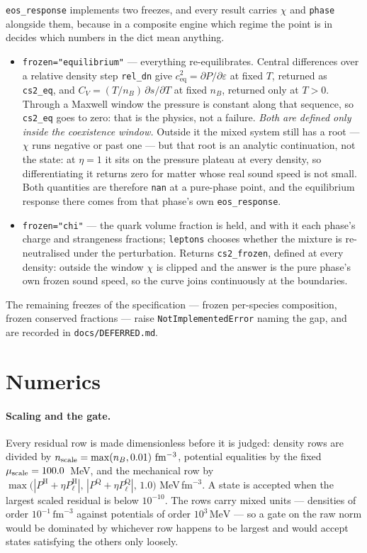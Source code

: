 \documentclass[aps,prc,onecolumn,superscriptaddress,nofootinbib,10pt]{revtex4-2}
\newcommand{\nB}{n_B}
\newcommand{\phH}{\mathrm{H}}
\newcommand{\phQ}{\mathrm{Q}}
\begin{document}
\texttt{eos\_response} implements two freezes, and every result carries
$\chi$ and \texttt{phase} alongside them, because in a composite engine which
regime the point is in decides which numbers in the dict mean anything.

\begin{itemize}
\item \texttt{frozen="equilibrium"} --- everything re-equilibrates. Central
  differences over a relative density step \texttt{rel\_dn} give
  $c_{\mathrm{eq}}^2 = \partial P/\partial\varepsilon$ at fixed $T$, returned
  as \texttt{cs2\_eq}, and $C_V = (T/\nB)\,\partial s/\partial T$ at fixed
  $\nB$, returned only at $T > 0$. Through a Maxwell window the pressure is
  constant along that sequence, so \texttt{cs2\_eq} goes to zero: that is the
  physics, not a failure. \emph{Both are defined only inside the coexistence
  window.} Outside it the mixed system still has a root --- $\chi$ runs
  negative or past one --- but that root is an analytic continuation, not the
  state: at $\eta = 1$ it sits on the pressure plateau at every density, so
  differentiating it returns zero for matter whose real sound speed is not
  small. Both quantities are therefore \texttt{nan} at a pure-phase point, and
  the equilibrium response there comes from that phase's own
  \texttt{eos\_response}.
\item \texttt{frozen="chi"} --- the quark volume fraction is held, and with it
  each phase's charge and strangeness fractions; \texttt{leptons} chooses
  whether the mixture is re-neutralised under the perturbation. Returns
  \texttt{cs2\_frozen}, defined at every density: outside the window $\chi$ is
  clipped and the answer is the pure phase's own frozen sound speed, so the
  curve joins continuously at the boundaries.
\end{itemize}

\noindent
The remaining freezes of the specification --- frozen per-species composition,
frozen conserved fractions --- raise \texttt{NotImplementedError} naming the
gap, and are recorded in \texttt{docs/DEFERRED.md}.

\section{Numerics}

\paragraph{Scaling and the gate.} Every residual row is made dimensionless
before it is judged: density rows are divided by
$n_{\rm scale} = \max(\nB, 0.01)\ \mathrm{fm^{-3}}$, potential equalities by the
fixed $\mu_{\rm scale} = 100.0$~MeV, and the mechanical row by
$\max\big(|P^\phH + \eta P_\ell^\phH|,\, |P^\phQ + \eta P_\ell^\phQ|,\,
1.0\big)$ MeV\,fm$^{-3}$. A state is accepted when the largest scaled residual
is below $10^{-10}$. The rows carry mixed units --- densities of order
$10^{-1}\,\mathrm{fm}^{-3}$ against potentials of order
$10^{3}\,\mathrm{MeV}$ --- so a gate on the raw norm would be dominated by
whichever row happens to be largest and would accept states satisfying the
others only loosely.
\end{document}

